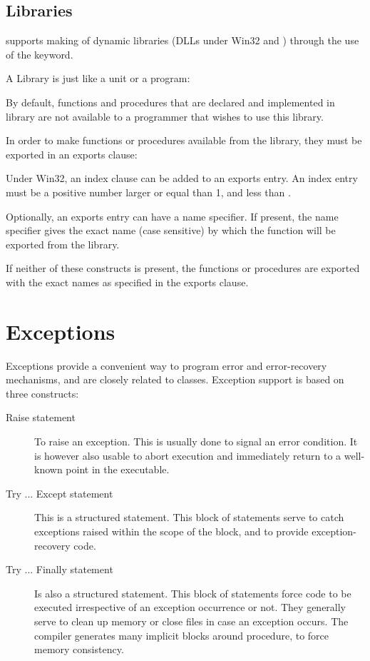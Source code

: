 \section{Libraries}
 

\fpc supports making of dynamic libraries (DLLs under Win32 and \ostwo) through
the use of the  keyword.

A Library is just like a unit or a program:


By default, functions and procedures that are declared and implemented in
library are not available to a programmer that wishes to use this library.

In order to make functions or procedures available from the library,
they must be exported in an exports clause:



Under Win32, an index clause can be added to an exports entry.
An index entry must be a positive number larger or equal than 1, and less
than .

Optionally, an exports entry can have a name specifier. If present, the name
specifier gives the exact name (case sensitive) by which the function will
be exported from the library.

If neither of these constructs is present, the functions or procedures
are exported with the exact names as specified in the exports clause.

\chapter{Exceptions}
\label{ch:Exceptions}
Exceptions provide a convenient way to program error and error-recovery
mechanisms, and are closely related to classes.
Exception support is based on three constructs:

\begin{description}
\item [Raise statement] To raise an exception. This is usually done to signal an
error condition. It is however also usable to
abort execution and immediately return to a well-known point in the
executable.
\item [Try ... Except statement] This is a structured statement. This block of statements serve to catch exceptions
raised within the scope of the block, and to provide exception-recovery
code.
\item [Try ... Finally statement] Is also a structured statement. This block of statements force code to be
executed irrespective of an exception occurrence or not. They generally
serve to clean up memory or close files in case an exception occurs.
The compiler generates many implicit  blocks around
procedure, to force memory consistency.
\end{description}

